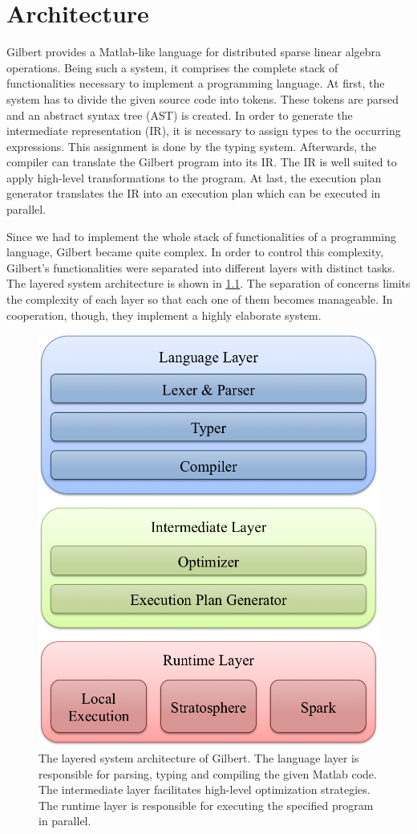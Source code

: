 \chapter{Architecture}
\label{cha:architecture}


Gilbert provides a Matlab-like language for distributed sparse linear algebra operations.
Being such a system, it comprises the complete stack of functionalities necessary to implement a programming language.
At first, the system has to divide the given source code into tokens.
These tokens are parsed and an abstract syntax tree (AST) is created.
In order to generate the intermediate representation (IR), it is necessary to assign types to the occurring expressions.
This assignment is done by the typing system.
Afterwards, the compiler can translate the Gilbert program into its IR.
The IR is well suited to apply high-level transformations to the program.
At last, the execution plan generator translates the IR into an execution plan which can be executed in parallel.

Since we had to implement the whole stack of functionalities of a programming language, Gilbert became quite complex.
In order to control this complexity, Gilbert's functionalities were separated into different layers with distinct tasks.
The layered system architecture is shown in \cref{fig:systemArchitecture}.
The separation of concerns limits the complexity of each layer so that each one of them becomes manageable.
In cooperation, though, they implement a highly elaborate system.

\begin{figure}
	\centering
	\includegraphics[width=0.5\linewidth]{images/systemArchitecture.png}
	\caption{The layered system architecture of Gilbert. The language layer is responsible for parsing, typing and compiling the given Matlab code. The intermediate layer facilitates high-level optimization strategies. The runtime layer is responsible for executing the specified program in parallel.}
	\label{fig:systemArchitecture}
\end{figure}

